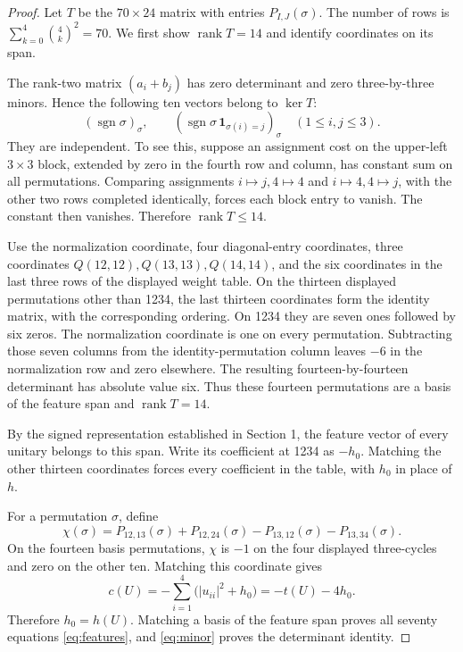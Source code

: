\documentclass[11pt,a4paper]{article}
\newcommand{\sgn}{\operatorname{sgn}}
\begin{document}
\begin{proof}
Let $T$ be the $70\times24$ matrix with entries $P_{I,J}(\sigma)$. The number of rows is $\sum_{k=0}^4\binom4k^2=70$. We first show $\operatorname{rank}T=14$ and identify coordinates on its span.

The rank-two matrix $(a_i+b_j)$ has zero determinant and zero three-by-three minors. Hence the following ten vectors belong to $\ker T$:
\[
(\sgn\sigma)_\sigma,\qquad
(\sgn\sigma\,\mathbf1_{\sigma(i)=j})_\sigma\quad(1\le i,j\le3).
\]
They are independent. To see this, suppose an assignment cost on the upper-left $3\times3$ block, extended by zero in the fourth row and column, has constant sum on all permutations. Comparing assignments $i\mapsto j,4\mapsto4$ and $i\mapsto4,4\mapsto j$, with the other two rows completed identically, forces each block entry to vanish. The constant then vanishes. Therefore $\operatorname{rank}T\le14$.

Use the normalization coordinate, four diagonal-entry coordinates, three coordinates $Q(12,12),\allowbreak Q(13,13),\allowbreak Q(14,14)$, and the six coordinates in the last three rows of the displayed weight table. On the thirteen displayed permutations other than 1234, the last thirteen coordinates form the identity matrix, with the corresponding ordering. On 1234 they are seven ones followed by six zeros. The normalization coordinate is one on every permutation. Subtracting those seven columns from the identity-permutation column leaves $-6$ in the normalization row and zero elsewhere. The resulting fourteen-by-fourteen determinant has absolute value six. Thus these fourteen permutations are a basis of the feature span and $\operatorname{rank}T=14$.

By the signed representation established in Section 1, the feature vector of every unitary belongs to this span. Write its coefficient at 1234 as $-h_0$. Matching the other thirteen coordinates forces every coefficient in the table, with $h_0$ in place of $h$.

For a permutation $\sigma$, define
\[
\chi(\sigma)=P_{12,13}(\sigma)+P_{12,24}(\sigma)-P_{13,12}(\sigma)-P_{13,34}(\sigma).
\]
On the fourteen basis permutations, $\chi$ is $-1$ on the four displayed three-cycles and zero on the other ten. Matching this coordinate gives
\[
c(U)=-\sum_{i=1}^4\bigl(|u_{ii}|^2+h_0\bigr)=-t(U)-4h_0.
\]
Therefore $h_0=h(U)$. Matching a basis of the feature span proves all seventy equations \eqref{eq:features}, and \eqref{eq:minor} proves the determinant identity.
\end{proof}
\end{document}
